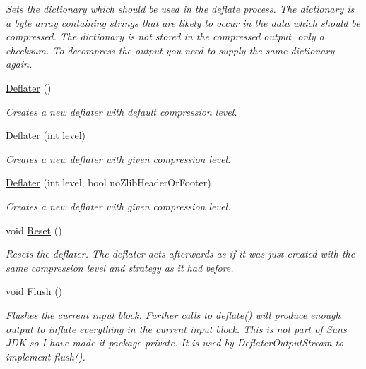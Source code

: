 \begin{DoxyCompactItemize}
\begin{DoxyCompactList}\small\item\em Sets the dictionary which should be used in the deflate process. The dictionary is a byte array containing strings that are likely to occur in the data which should be compressed. The dictionary is not stored in the compressed output, only a checksum. To decompress the output you need to supply the same dictionary again. \end{DoxyCompactList}\item 
\hyperlink{class_i_c_sharp_code_1_1_sharp_zip_lib_1_1_zip_1_1_compression_1_1_deflater_aef92661d02455221261ea607e29710f2}{Deflater} ()
\begin{DoxyCompactList}\small\item\em Creates a new deflater with default compression level. \end{DoxyCompactList}\item 
\hyperlink{class_i_c_sharp_code_1_1_sharp_zip_lib_1_1_zip_1_1_compression_1_1_deflater_a038451ce25b9917398218c5c741e9fb2}{Deflater} (int level)
\begin{DoxyCompactList}\small\item\em Creates a new deflater with given compression level. \end{DoxyCompactList}\item 
\hyperlink{class_i_c_sharp_code_1_1_sharp_zip_lib_1_1_zip_1_1_compression_1_1_deflater_a8bfca90e822ab3e9984ad3287e95a61a}{Deflater} (int level, bool no\+Zlib\+Header\+Or\+Footer)
\begin{DoxyCompactList}\small\item\em Creates a new deflater with given compression level. \end{DoxyCompactList}\item 
void \hyperlink{class_i_c_sharp_code_1_1_sharp_zip_lib_1_1_zip_1_1_compression_1_1_deflater_a61fe4fb8d97829e1910afbe6fd8be79c}{Reset} ()
\begin{DoxyCompactList}\small\item\em Resets the deflater. The deflater acts afterwards as if it was just created with the same compression level and strategy as it had before. \end{DoxyCompactList}\item 
void \hyperlink{class_i_c_sharp_code_1_1_sharp_zip_lib_1_1_zip_1_1_compression_1_1_deflater_a98a7b88b7209a07bcd5f69ab94863116}{Flush} ()
\begin{DoxyCompactList}\small\item\em Flushes the current input block. Further calls to deflate() will produce enough output to inflate everything in the current input block. This is not part of Sun\textquotesingle{}s J\+DK so I have made it package private. It is used by Deflater\+Output\+Stream to implement flush(). \end{DoxyCompactList}\item 

\end{DoxyCompactItemize}
